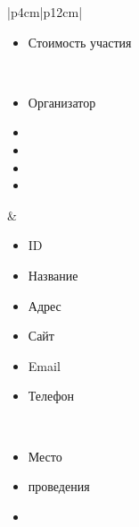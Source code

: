 \begin{table}[h!]
\begin{center}
\begin{threeparttable}
\begin{tabular}{|p{4cm}|p{12cm}|}
\begin{minipage}[t]{\linewidth}
\begin{multicols}{2}
\begin{itemize}[leftmargin=0mm,labelsep=0mm,nosep,after=\strut]
                  \item[] Стоимость участия
                \end{itemize}
              \end{multicols}
            \end{minipage}\\
            \hline
            \begin{minipage}[t]{\linewidth}
              \begin{multicols}{1}
                \begin{itemize}[leftmargin=0mm,labelsep=0mm,nosep,after=\strut]
                  \item[] Организатор
                  \item[]
                  \item[]
                  \item[]
                  \item[]
                \end{itemize}
              \end{multicols}
            \end{minipage}
          & \begin{minipage}[t]{\linewidth}
              \begin{multicols}{2}
                \begin{itemize}[leftmargin=0mm,labelsep=0mm,nosep,after=\strut]
                  \item[] ID
                  \item[] Название
                  \item[] Адрес
                  \item[] Сайт
                  \item[] Email
                  \item[] Телефон
                \end{itemize}
              \end{multicols}
            \end{minipage}\\
            \hline
            \begin{minipage}[t]{\linewidth}
              \begin{multicols}{1}
                \begin{itemize}[leftmargin=0mm,labelsep=0mm,nosep,after=\strut]
                  \item[] Место 
                  \item[] проведения
                  \item[]

\end{itemize}
\end{multicols}
\end{minipage}
\end{tabular}
\end{threeparttable}
\end{center}
\end{table}
